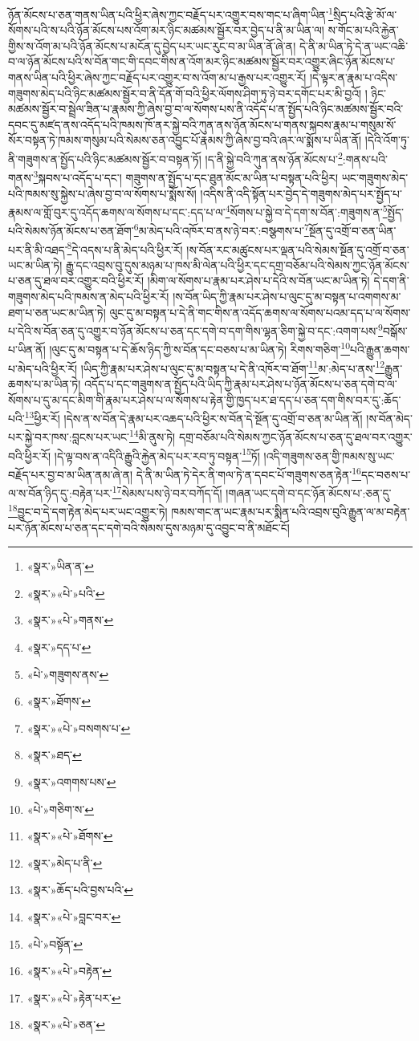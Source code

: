 ཉོན་མོངས་པ་ཅན་གནས་ཡིན་པའི་ཕྱིར་ཞེས་ཀྱང་བརྗོད་པར་འགྱུར་བས་གང་པ་ཞིག་ཡིན་\footnote{«སྣར་»ཡིན་ན་}སྲིད་པའི་རྩེ་མོ་ལ་སོགས་པའི་ས་པའི་ཉོན་མོངས་པས་འོག་མར་ཉིང་མཚམས་སྦྱོར་བར་བྱེད་པ་ནི་མ་ཡིན་ལ། ས་གོང་མ་པའི་རྐྱེན་གྱིས་ས་འོག་མ་པའི་ཉོན་མོངས་པ་མངོན་དུ་བྱེད་པར་ཡང་རུང་བ་མ་ཡིན་ནོ་ཞེ་ན། དེ་ནི་མ་ཡིན་ཏེ་དེ་ན་ཡང་འཆི་བ་ལ་ཉོན་མོངས་པའི་ས་བོན་གང་གི་དབང་གིས་ན་འོག་མར་ཉིང་མཚམས་སྦྱོར་བར་འགྱུར་ཞིང་ཉོན་མོངས་པ་གནས་ཡིན་པའི་ཕྱིར་ཞེས་ཀྱང་བརྗོད་པར་འགྱུར་བ་ས་འོག་མ་པ་རྒྱས་པར་འགྱུར་རོ། །དེ་ལྟར་ན་རྣམ་པ་འདིས་གཟུགས་མེད་པའི་ཉིང་མཚམས་སྦྱོར་བ་ནི་དོན་གོ་བའི་ཕྱིར་ལོགས་ཤིག་ཏུ་ཉེ་བར་དགོང་པར་མི་བྱའོ། །
ཉིང་མཚམས་སྦྱོར་བ་སྦྲེལ་ཟིན་པ་རྣམས་ཀྱི་ཞེས་བྱ་བ་ལ་སོགས་པས་ནི་འདོད་པ་ན་སྤྱོད་པའི་ཉིང་མཚམས་སྦྱོར་བའི་དབང་དུ་མཛད་ནས་འདོད་པའི་ཁམས་ཁོ་ནར་སྐྱེ་བའི་ཀུན་ནས་ཉོན་མོངས་པ་གནས་སྐབས་རྣམ་པ་གསུམ་སོ་སོར་བསྟན་ཏེ་ཁམས་གསུམ་པའི་སེམས་ཅན་འབྱུང་པོ་རྣམས་ཀྱི་ཞེས་བྱ་བའི་ཞར་ལ་སྨོས་པ་ཡིན་ནོ། །དེའི་འོག་ཏུ་ནི་གཟུགས་ན་སྤྱོད་པའི་ཉིང་མཚམས་སྦྱོར་བ་བསྟན་ཏོ། །ད་ནི་སྐྱེ་བའི་ཀུན་ནས་ཉོན་མོངས་པ་\footnote{«སྣར་»«པེ་»པའི་}:གནས་པའི་གནས་\footnote{«སྣར་»«པེ་»གནས་}སྐབས་པ་འདོད་པ་དང་། གཟུགས་ན་སྤྱོད་པ་དང་ཐུན་མོང་མ་ཡིན་པ་བསྟན་པའི་ཕྱིར། ཡང་གཟུགས་མེད་པའི་ཁམས་སུ་སྐྱེས་པ་ཞེས་བྱ་བ་ལ་སོགས་པ་སྨོས་སོ། །འདིས་ནི་འདི་སྟོན་པར་བྱེད་དེ་གཟུགས་མེད་པར་སྤྱོད་པ་རྣམས་ལ་གློ་བུར་དུ་འདོད་ཆགས་ལ་སོགས་པ་དང་:དད་པ་ལ་\footnote{«སྣར་»དད་པ་}སོགས་པ་སྐྱེ་བ་དེ་དག་ས་བོན་:གཟུགས་ན་\footnote{«པེ་»གཟུགས་ནས་}སྤྱོད་པའི་སེམས་ཉོན་མོངས་པ་ཅན་ཐོག་\footnote{«སྣར་»ཐོགས་}མ་མེད་པའི་འཁོར་བ་ནས་ཉེ་བར་:བསྩགས་པ་\footnote{«སྣར་»«པེ་»བསགས་པ་}སྔོན་དུ་འགྲོ་བ་ཅན་ཡིན་པར་ནི་མི་འཐད་\footnote{«སྣར་»ཐད་}དེ་འདས་པ་ནི་མེད་པའི་ཕྱིར་རོ། །ས་བོན་རང་མཚུངས་པར་ལྡན་པའི་སེམས་སྔོན་དུ་འགྲོ་བ་ཅན་ཡང་མ་ཡིན་ཏེ། རྒྱུ་དང་འབྲས་བུ་དུས་མཉམ་པ་ཁས་མི་ལེན་པའི་ཕྱིར་དང་དགྲ་བཅོམ་པའི་སེམས་ཀྱང་ཉོན་མོངས་པ་ཅན་དུ་ཐལ་བར་འགྱུར་བའི་ཕྱིར་རོ། །མིག་ལ་སོགས་པ་རྣམ་པར་ཤེས་པ་དེའི་ས་བོན་ཡང་མ་ཡིན་ཏེ། དེ་དག་ནི་གཟུགས་མེད་པའི་ཁམས་ན་མེད་པའི་ཕྱིར་རོ། །ས་བོན་ཡིད་ཀྱི་རྣམ་པར་ཤེས་པ་ལུང་དུ་མ་བསྟན་པ་འགགས་མ་ཐག་པ་ཅན་ཡང་མ་ཡིན་ཏེ། ལུང་དུ་མ་བསྟན་པ་དེ་ནི་གང་གིས་ན་འདོད་ཆགས་ལ་སོགས་པའམ་དད་པ་ལ་སོགས་པ་དེའི་ས་བོན་ཅན་དུ་འགྱུར་བ་ཉོན་མོངས་པ་ཅན་དང་དགེ་བ་དག་གིས་ལྷན་ཅིག་སྐྱེ་བ་དང་:འགག་པས་\footnote{«སྣར་»འགགས་པས་}བསྒོས་པ་ཡིན་ནོ། །ལུང་དུ་མ་བསྟན་པ་དེ་ཆོས་ཉིད་ཀྱི་ས་བོན་དང་བཅས་པ་མ་ཡིན་ཏེ། རིགས་གཅིག་\footnote{«པེ་»གཅིག་ས་}པའི་རྒྱུན་ཆགས་པ་མེད་པའི་ཕྱིར་རོ། །ཡིད་ཀྱི་རྣམ་པར་ཤེས་པ་ལུང་དུ་མ་བསྟན་པ་དེ་ནི་འཁོར་བ་ཐོག་\footnote{«སྣར་»«པེ་»ཐོགས་}མ་:མེད་པ་ནས་\footnote{«སྣར་»མེད་པ་ནི་}རྒྱུན་ཆགས་པ་མ་ཡིན་ཏེ། འདོད་པ་དང་གཟུགས་ན་སྤྱོད་པའི་ཡིད་ཀྱི་རྣམ་པར་ཤེས་པ་ཉོན་མོངས་པ་ཅན་དགེ་བ་ལ་སོགས་པ་དུ་མ་དང་མིག་གི་རྣམ་པར་ཤེས་པ་ལ་སོགས་པ་རྟེན་གྱི་ཁྱད་པར་ཐ་དད་པ་ཅན་དག་གིས་བར་དུ་:ཆོད་པའི་\footnote{«སྣར་»ཆོད་པའི་བྱས་པའི་}ཕྱིར་རོ། །དེས་ན་ས་བོན་དེ་རྣམ་པར་འཆད་པའི་ཕྱིར་ས་བོན་དེ་སྔོན་དུ་འགྲོ་བ་ཅན་མ་ཡིན་ནོ། །ས་བོན་མེད་པར་སྐྱེ་བར་ཁས་:བླངས་པར་ཡང་\footnote{«སྣར་»«པེ་»བླང་བར་}མི་ནུས་ཏེ། དགྲ་བཅོམ་པའི་སེམས་ཀྱང་ཉོན་མོངས་པ་ཅན་དུ་ཐལ་བར་འགྱུར་བའི་ཕྱིར་རོ། །དེ་ལྟ་བས་ན་འདིའི་རྒྱུའི་རྐྱེན་མེད་པར་རབ་ཏུ་བསྟན་\footnote{«པེ་»བསྟོན་}ཏོ། །འདི་གཟུགས་ཅན་གྱི་ཁམས་སུ་ཡང་བརྗོད་པར་བྱ་བ་མ་ཡིན་ནམ་ཞེ་ན། དེ་ནི་མ་ཡིན་ཏེ་དེར་ནི་གལ་ཏེ་ན་དབང་པོ་གཟུགས་ཅན་རྟེན་\footnote{«སྣར་»«པེ་»བརྟེན་}དང་བཅས་པ་ལ་ས་བོན་ཉིད་དུ་:བརྟེན་པར་\footnote{«སྣར་»«པེ་»རྟེན་པར་}སེམས་པས་ཉེ་བར་བཀོད་དོ། །གཞན་ཡང་དགེ་བ་དང་ཉོན་མོངས་པ་:ཅན་དུ་\footnote{«སྣར་»«པེ་»ཅན་}བྱུང་བ་དེ་དག་རྟེན་མེད་པར་ཡང་འགྱུར་ཏེ། ཁམས་གང་ན་ཡང་རྣམ་པར་སྨིན་པའི་འབྲས་བུའི་རྒྱུན་ལ་མ་བརྟེན་པར་ཉོན་མོངས་པ་ཅན་དང་དགེ་བའི་སེམས་དུས་མཉམ་དུ་འབྱུང་བ་ནི་མཐོང་ངོ། 